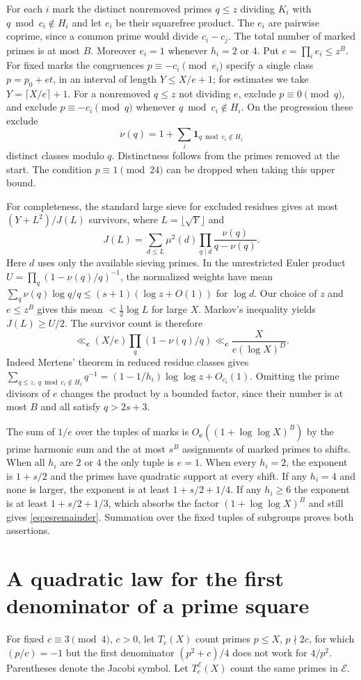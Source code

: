 \documentclass[a4paper,11pt]{article}
\theoremstyle{definition}\newtheorem{question}[theorem]{Question}
\begin{document}
For each $i$ mark the distinct nonremoved primes $q\le z$ dividing
$K_i$ with $q\bmod c_i\notin H_i$ and let $e_i$ be their squarefree
product. The $e_i$ are pairwise coprime, since a common prime would
divide $c_i-c_j$. The total number of marked primes is at most $B$.
Moreover $e_i=1$ whenever $h_i=2$ or $4$. Put $e=\prod_i e_i\le z^B$.
For fixed marks the congruences $p\equiv-c_i\pmod{e_i}$ specify a
single class $p=p_0+e t$, in an interval of length $Y\le X/e+1$;
for estimates we take $Y=\lceil X/e\rceil+1$.
For a nonremoved $q\le z$ not dividing $e$, exclude $p\equiv0\pmod q$,
and exclude $p\equiv-c_i\pmod q$ whenever $q\bmod c_i\notin H_i$.
On the progression these exclude
\[
 \nu(q)=1+\sum_i\boldsymbol{1}_{q\bmod c_i\notin H_i}
\]
distinct classes modulo $q$. Distinctness follows from the primes
removed at the start. The condition $p\equiv1\pmod{24}$ can be
dropped when taking this upper bound.

For completeness, the standard large sieve for excluded residues \cite{sieve} gives
at most $(Y+L^2)/J(L)$ survivors, where $L=\lfloor\sqrt Y\rfloor$ and
\[
 J(L)=\sum_{d\le L}\mu^2(d)\prod_{q\mid d}\frac{\nu(q)}{q-\nu(q)}.
\]
Here $d$ uses only the available sieving primes. In the unrestricted
Euler product $U=\prod_q(1-\nu(q)/q)^{-1}$, the normalized weights
have mean $\sum_q\nu(q)\log q/q\le(s+1)(\log z+O(1))$ for $\log d$.
Our choice of $z$ and $e\le z^B$ gives this mean $<\frac12\log L$
for large $X$. Markov's inequality yields $J(L)\ge U/2$.
The survivor count is therefore
\[
 \ll_{\mathbf c}(X/e)\prod_q(1-\nu(q)/q)
 \ll_{\mathbf c} \frac{X}{e(\log X)^D}.
\]
Indeed Mertens' theorem in reduced residue classes gives
$\sum_{q\le z,\ q\bmod c_i\notin H_i}q^{-1}
 =(1-1/h_i)\log\log z+O_{c_i}(1)$. Omitting the prime divisors of
$e$ changes the product by a bounded factor, since their number is
at most $B$ and all satisfy $q>2s+3$.

The sum of $1/e$ over the tuples of marks is
$O_{\mathbf c}((1+\log\log X)^B)$ by the prime harmonic sum
and the at most $s^B$ assignments of marked primes to shifts.
When all $h_i$ are $2$ or $4$ the only tuple is $e=1$.
When every $h_i=2$, the exponent is $1+s/2$ and the primes have
quadratic support at every shift. If any $h_i=4$ and none is larger,
the exponent is at least $1+s/2+1/4$. If any $h_i\ge6$ the exponent
is at least $1+s/2+1/3$, which absorbs the factor
$(1+\log\log X)^B$ and still gives \eqref{eq:esremainder}.
Summation over the fixed tuples of subgroups proves both assertions.


\section{A quadratic law for the first denominator of a prime square}
For fixed
$c\equiv3\pmod4$, $c>0$, let $T_c(X)$ count primes $p\le X$, $p\nmid 2c$,
for which $(p/c)=-1$ but the first denominator $(p^2+c)/4$ does not work
for $4/p^2$. Parentheses denote the Jacobi symbol.
Let $T_c^{\mathcal E}(X)$ count the same primes in $\mathcal E$.
\end{document}

